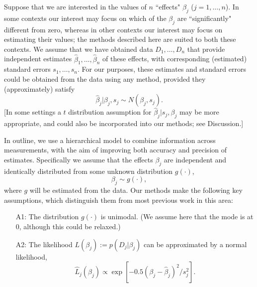 \documentclass[11pt]{article}
\begin{document}
 Suppose that we are interested in the values of $n$ ``effects" $\beta_j$ ($j=1,\dots,n$). In some contexts our interest may focus on which of the $\beta_j$ are ``significantly" different from zero, whereas in other contexts our interest may focus on estimating their values; the methods described here are suited to both these contexts.
 We assume that we have obtained data $D_1,\dots,D_n$ that provide independent estimates $\hat\beta_1,\dots,\hat\beta_n$ of these effects,
 with corresponding (estimated) standard errors $s_1,\dots,s_n$. For our purposes, these estimates and standard errors could be obtained from the data
 using any method, provided they (approximately) satisfy 
 \begin{equation} \label{eqn:betahat}
 \hat\beta_j | \beta_j, s_j \sim N(\beta_j, s_j).
 \end{equation}
 [In some settings a $t$ distribution assumption for $\hat\beta_j | s_j, \beta_j$ may be more appropriate, and could also be incorporated into our methods; see Discussion.]
 
 In outline, we use a hierarchical model to combine information across measurements, with the aim of improving both accuracy and precision of estimates. 
 Specifically we assume that the effects $\beta_j$ are independent and identically distributed from some unknown distribution $g(\cdot)$,
 \begin{equation} \label{eqn:beta}
 \beta_j \sim g(\cdot),
 \end{equation}
 where $g$ will be estimated from
 the data.  Our methods make the following key assumptions, which distinguish them from most previous work in this area:
   \begin{enumerate}
  \item[A1:] The distribution $g(\cdot)$ is unimodal. (We assume here that the mode is at 0, although 
this could be relaxed.)  
 \item[A2:] The likelihood $L(\beta_j) := p(D_j | \beta_j)$ can be approximated by a normal likelihood,
 \begin{equation} \label{eqn:lik}
 \hat{L}_j(\beta_j) \propto \exp[-0.5(\beta_j-\hat\beta_j)^2/s_j^2].
 \end{equation}
 \end{enumerate}
 
\end{document}
